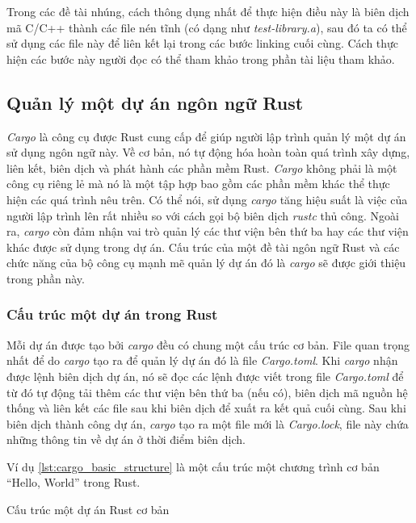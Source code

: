 Trong các đề tài nhúng, cách thông dụng nhất để thực hiện điều này là biên dịch mã C/C++ thành các file nén tĩnh (có dạng như \emph{test-library.a}), sau đó ta có thể sử dụng các file này để liên kết lại trong các bước linking cuối cùng.
Cách thực hiện các bước này người đọc có thể tham khảo trong phần tài liệu tham khảo.

\subsection{Quản lý một dự án ngôn ngữ Rust}
\emph{Cargo} là công cụ được Rust cung cấp để giúp người lập trình quản lý một dự án sử dụng ngôn ngữ này.
Về cơ bản, nó tự động hóa hoàn toàn quá trình xây dựng, liên kết, biên dịch và phát hành các phần mềm Rust.
\emph{Cargo} không phải là một công cụ riêng lẻ mà nó là một tập hợp bao gồm các phần mềm khác thể thực hiện các quá trình nêu trên.
Có thể nói, sử dụng \emph{cargo} tăng hiệu suất là việc của người lập trình lên rất nhiều so với cách gọi bộ biên dịch \emph{rustc} thủ công.
Ngoài ra, \emph{cargo} còn đảm nhận vai trò quản lý các thư viện bên thứ ba hay các thư viện khác được sử dụng trong dự án.
Cấu trúc của một đề tài ngôn ngữ Rust và các chức năng của bộ công cụ mạnh mẽ quản lý dự án đó là \emph{cargo} sẽ được giới thiệu trong phần này.

\subsubsection{Cấu trúc một dự án trong Rust} \label{lbl:basic_rust_proj_structure}
Mỗi dự án được tạo bởi \emph{cargo} đều có chung một cấu trúc cơ bản.
File quan trọng nhất để do \emph{cargo} tạo ra để quản lý dự án đó là file \emph{Cargo.toml}.
Khi \emph{cargo} nhận được lệnh biên dịch dự án, nó sẽ đọc các lệnh được viết trong file \emph{Cargo.toml} để từ đó tự động tải thêm các thư viện bên thứ ba (nếu có), biên dịch mã nguồn hệ thống và liên kết các file sau khi biên dịch để xuất ra kết quả cuối cùng.
Sau khi biên dịch thành công dự án, \emph{cargo} tạo ra một file mới là \emph{Cargo.lock}, file này chứa những thông tin về dự án ở thời điểm biên dịch.

Ví dụ \ref{lst:cargo_basic_structure} là một cấu trúc một chương trình cơ bản ``Hello, World'' trong Rust.
\begin{listing}
\caption{Cấu trúc một dự án Rust cơ bản}
\label{lst:cargo_basic_structure}
\end{listing}


